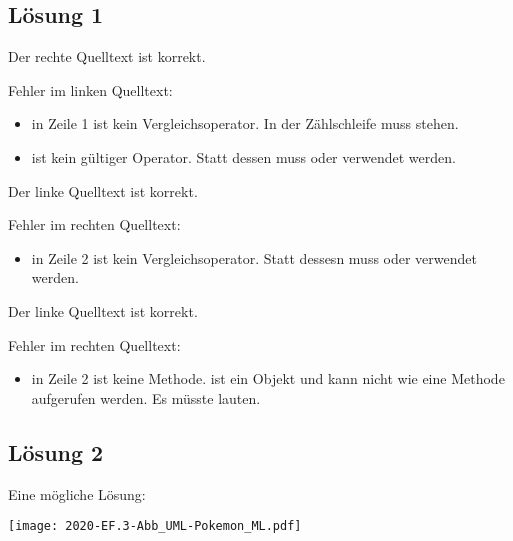 \documentclass[a4paper,ngerman,fontsize=10pt]{scrartcl}
\begin{document}
\subsection*{Lösung 1}
\begin{enumn}
	\item Der rechte Quelltext ist korrekt.

	Fehler im linken Quelltext:
	\begin{itemize}
		\item \code{<<} in Zeile 1 ist kein Vergleichsoperator. In der Zählschleife muss  stehen.
		\item \code{++=} ist kein gültiger Operator. Statt dessen muss  oder  verwendet werden.
	\end{itemize}

	\item Der linke Quelltext ist korrekt.

	Fehler im rechten Quelltext:
	\begin{itemize}
		\item {} in Zeile 2 ist kein Vergleichsoperator. Statt dessesn muss \code{\&} oder \code{\&\&} verwendet werden.
	\end{itemize}

	\item Der linke Quelltext ist korrekt.

	Fehler im rechten Quelltext:
	\begin{itemize}
		\item {} in Zeile 2 ist keine Methode.
			   ist ein Objekt und kann nicht wie eine Methode aufgerufen werden.
			  Es müsste  lauten.
	\end{itemize}
\end{enumn}

\subsection*{Lösung 2}
Eine mögliche Lösung:
\begin{center}
	\texttt{[image: 2020-EF.3-Abb\_UML-Pokemon\_ML.pdf]}
\end{center}
\end{document}
